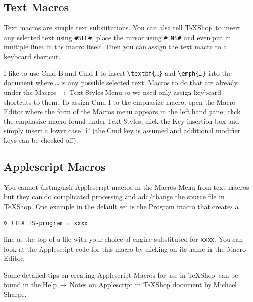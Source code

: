 \documentclass[letterpaper,11pt]{article}
\newcommand{\TS}{\textsf{\TeX Shop}}
\newcommand{\cmd}[1]{\textsf{#1}}
\newcommand{\mnu}[1]{\textsf{#1}}
\newcommand{\To}{\,\(\to\)\,}
\begin{document}
\subsection{Text Macros}

Text macros are simple text substitutions. You can also tell \TS\ to insert any selected text using \verb|#SEL#|, place the cursor using \verb|#INS#| and even put in multiple lines in the macro itself. Then you can assign the text macro to a keyboard shortcut.

I like to use \cmd{Cmd-B} and \cmd{Cmd-I} to insert \verb|\textbf{…}| and \verb|\emph{…}| into the document where \texttt{…} is any possible selected text. Macros to do that are already under the \mnu{Macros}\To\mnu{Text Styles} Menu so we need only assign keyboard shortcuts to them. To assign \cmd{Cmd-I} to the \mnu{emphasize} macro: open the \mnu{Macro Editor} where the form of the \mnu{Macros} menu appears in the left hand pane; click the \mnu{emphasize} macro found under \mnu{Text Styles}; click the Key insertion box and simply insert a lower case `\texttt{i}' (the \cmd{Cmd} key is assumed and additional modifier keys can be checked off).

\subsection{Applescript Macros}

You cannot distinguish Applescript macros in the \mnu{Macros} Menu from text macros but they can do complicated processing and add/change the source file in \TS. One example in the default set is the \mnu{Program} macro that creates a
\begin{verbatim}
% !TEX TS-program = xxxx
\end{verbatim}
line at the top of a file with your choice of engine substituted for \texttt{xxxx}. You can look at the Applescript code for this macro by clicking on its name in the \mnu{Macro Editor}.

Some detailed tips on creating Applescript Macros for use in \TS\ can be found in the \mnu{Help}\To\mnu{Notes on Applescript in TeXShop} document by Michael Sharpe.


\end{document}

